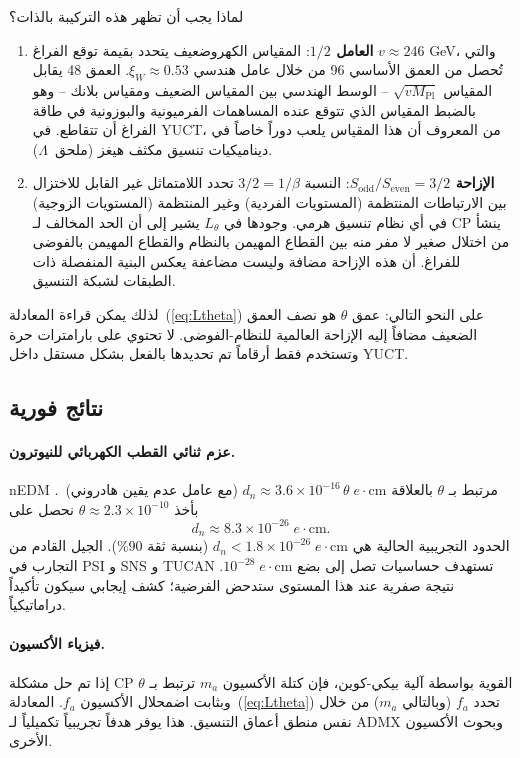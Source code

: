 \documentclass[12pt,a4paper]{article}
\begin{document}
	لماذا يجب أن تظهر هذه التركيبة بالذات؟
	\begin{enumerate}
		\item \textbf{العامل \(1/2\)}: المقياس الكهروضعيف يتحدد بقيمة توقع الفراغ \(v \approx 246\) GeV، والتي تُحصل من العمق الأساسي 96 من خلال عامل هندسي \(\xi_W \approx 0.53\). العمق 48 يقابل المقياس \(\sqrt{v M_{\mathrm{Pl}}}\) – الوسط الهندسي بين المقياس الضعيف ومقياس بلانك – وهو بالضبط المقياس الذي تتوقع عنده المساهمات الفرميونية والبوزونية في طاقة الفراغ أن تتقاطع. في YUCT، من المعروف أن هذا المقياس يلعب دوراً خاصاً في ديناميكيات تنسيق مكثف هيغز (ملحق~\(\Lambda\)).
		\item \textbf{الإزاحة \(S_{\mathrm{odd}}/S_{\mathrm{even}} = 3/2\)}: النسبة \(3/2 = 1/\beta\) تحدد اللامتماثل غير القابل للاختزال بين الارتباطات المنتظمة (المستويات الفردية) وغير المنتظمة (المستويات الزوجية) في أي نظام تنسيق هرمي. وجودها في \(L_\theta\) يشير إلى أن الحد المخالف لـ CP ينشأ من اختلال صغير لا مفر منه بين القطاع المهيمن بالنظام والقطاع المهيمن بالفوضى للفراغ. أن هذه الإزاحة مضافة وليست مضاعفة يعكس البنية المنفصلة ذات الطبقات لشبكة التنسيق.
	\end{enumerate}
	
	لذلك يمكن قراءة المعادلة~(\ref{eq:Ltheta}) على النحو التالي: عمق \(\theta\) هو نصف العمق الضعيف مضافاً إليه الإزاحة العالمية للنظام-الفوضى. لا تحتوي على بارامترات حرة وتستخدم فقط أرقاماً تم تحديدها بالفعل بشكل مستقل داخل YUCT.
	
	\subsection{نتائج فورية}
	
	\paragraph{عزم ثنائي القطب الكهربائي للنيوترون.}
	nEDM مرتبط بـ \(\theta\) بالعلاقة \(d_n \approx 3.6 \times 10^{-16}\,\theta\; e\!\cdot\!\mathrm{cm}\) (مع عامل عدم يقين هادروني)~\cite{nEDM2020}. بأخذ \(\theta \approx 2.3 \times 10^{-10}\) نحصل على
	\[
	d_n \approx 8.3 \times 10^{-26}\; e\!\cdot\!\mathrm{cm}.
	\]
	الحدود التجريبية الحالية هي \(d_n < 1.8 \times 10^{-26}\; e\!\cdot\!\mathrm{cm}\) (بنسبة ثقة 90\%). الجيل القادم من التجارب في PSI و SNS و TUCAN تستهدف حساسيات تصل إلى بضع \(10^{-28}\; e\!\cdot\!\mathrm{cm}\). نتيجة صفرية عند هذا المستوى ستدحض الفرضية؛ كشف إيجابي سيكون تأكيداً دراماتيكياً.
	
	\paragraph{فيزياء الأكسيون.}
	إذا تم حل مشكلة CP القوية بواسطة آلية بيكي-كوين، فإن كتلة الأكسيون \(m_a\) ترتبط بـ \(\theta\) وبثابت اضمحلال الأكسيون \(f_a\). المعادلة~(\ref{eq:Ltheta}) تحدد \(f_a\) (وبالتالي \(m_a\)) من خلال نفس منطق أعماق التنسيق. هذا يوفر هدفاً تجريبياً تكميلياً لـ ADMX وبحوث الأكسيون الأخرى.
	
\end{document}
